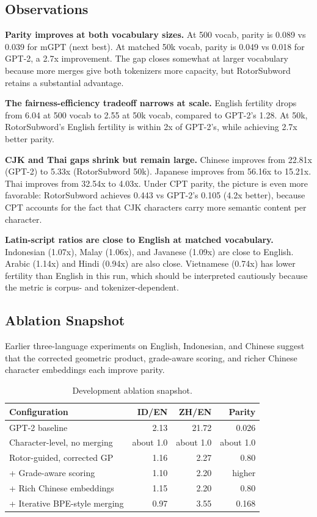 \documentclass[11pt]{article}
\begin{document}
\subsection{Observations}

\textbf{Parity improves at both vocabulary sizes.} At 500 vocab, parity is 0.089 vs 0.039 for mGPT (next best). At matched 50k vocab, parity is 0.049 vs 0.018 for GPT-2, a 2.7x improvement. The gap closes somewhat at larger vocabulary because more merges give both tokenizers more capacity, but RotorSubword retains a substantial advantage.

\textbf{The fairness-efficiency tradeoff narrows at scale.} English fertility drops from 6.04 at 500 vocab to 2.55 at 50k vocab, compared to GPT-2's 1.28. At 50k, RotorSubword's English fertility is within 2x of GPT-2's, while achieving 2.7x better parity.

\textbf{CJK and Thai gaps shrink but remain large.} Chinese improves from 22.81x (GPT-2) to 5.33x (RotorSubword 50k). Japanese improves from 56.16x to 15.21x. Thai improves from 32.54x to 4.03x. Under CPT parity, the picture is even more favorable: RotorSubword achieves 0.443 vs GPT-2's 0.105 (4.2x better), because CPT accounts for the fact that CJK characters carry more semantic content per character.

\textbf{Latin-script ratios are close to English at matched vocabulary.} Indonesian (1.07x), Malay (1.06x), and Javanese (1.09x) are close to English. Arabic (1.14x) and Hindi (0.94x) are also close. Vietnamese (0.74x) has lower fertility than English in this run, which should be interpreted cautiously because the metric is corpus- and tokenizer-dependent.

\subsection{Ablation Snapshot}

Earlier three-language experiments on English, Indonesian, and Chinese suggest that the corrected geometric product, grade-aware scoring, and richer Chinese character embeddings each improve parity.

\begin{table}[htbp]
\centering
\caption{Development ablation snapshot.}
\label{tab:ablation}
\begin{tabular}{lrrr}
\toprule
Configuration & ID/EN & ZH/EN & Parity \\
\midrule
GPT-2 baseline & 2.13 & 21.72 & 0.026 \\
Character-level, no merging & about 1.0 & about 1.0 & about 1.0 \\
Rotor-guided, corrected GP & 1.16 & 2.27 & 0.80 \\
+ Grade-aware scoring & 1.10 & 2.20 & higher \\
+ Rich Chinese embeddings & 1.15 & 2.20 & 0.80 \\
+ Iterative BPE-style merging & 0.97 & 3.55 & 0.168 \\
\bottomrule
\end{tabular}
\end{table}
\end{document}

